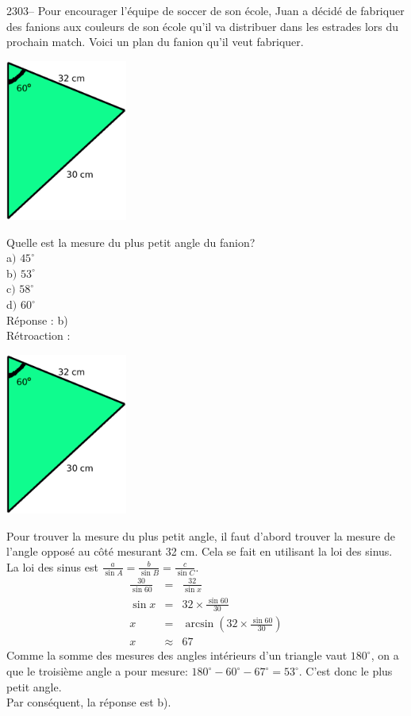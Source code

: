 \documentclass[letterpaper, 12pt]{article}
\begin{document}
2303-- Pour encourager l'\'equipe de soccer de son \'ecole, Juan a d\'ecid\'e de fabriquer des fanions aux couleurs de son \'ecole qu'il va distribuer dans les estrades lors du prochain match. Voici un plan du fanion qu'il veut fabriquer.
\begin{center}
 \includegraphics[width=4cm,bb=14 14 431 564]{Q2303.eps}
\end{center}
Quelle est la mesure du plus petit angle du fanion? \\

a$)$ $45^{\circ}$\\
b$)$ $53^{\circ}$\\
c$)$ $58^{\circ}$\\
d$)$ $60^{\circ}$\\

R\'eponse : b)\\

R\'etroaction :
\begin{center}
 \includegraphics[width=4cm,bb=14 14 431 564]{Q2303.eps}
\end{center}
Pour trouver la mesure du plus petit angle, il faut d'abord trouver la mesure de l'angle oppos\'e au c\^ot\'e mesurant 32 cm. Cela se fait en utilisant la loi des sinus. La loi des sinus est $\frac{a}{\sin{A}}=\frac{b}{\sin{B}}=\frac{c}{\sin{C}}$.
\begin{eqnarray*}
\frac{30}{\sin{60}}&=&\frac{32}{\sin{x}}\\[2mm]
\sin{x}&=&32\times\frac{\sin{60}}{30}\\[2mm]
x&=&\arcsin{\left(32\times\frac{\sin{60}}{30}\right)}\\[2mm]
x&\approx&67
\end{eqnarray*}
Comme la somme des mesures des angles int\'erieurs d'un triangle vaut $180^{\circ}$, on a que le troisi\`eme angle a pour mesure: $180^{\circ}-60^{\circ}-67^{\circ}=53^{\circ}$. C'est donc le plus petit angle.\\
Par cons\'equent, la r\'eponse est b).\\
\end{document}
